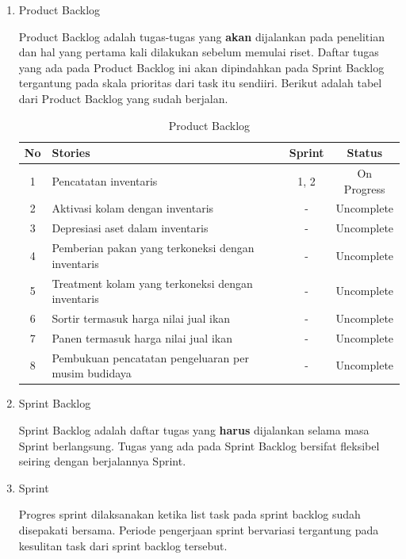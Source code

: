\begin{enumerate}
	\item Product Backlog
	
	Product Backlog adalah tugas-tugas yang \textbf{akan} dijalankan pada penelitian dan hal yang pertama kali dilakukan sebelum memulai riset. Daftar tugas yang ada pada Product Backlog ini akan dipindahkan pada Sprint Backlog tergantung pada skala prioritas dari task itu sendiiri. Berikut adalah tabel dari Product Backlog yang sudah berjalan.

	\begin{table}[H]	
		\begin{center}
			\caption{Product Backlog}
			\label{tab:table5}
			\begin{tabular}{|c|m{17em}|c|c|}
			\hline
			\textbf{No} & \textbf{Stories} & \textbf{Sprint} & \textbf{Status} \\
			\hline
			1 & Pencatatan inventaris & 1, 2 & On Progress \\
			\hline
			2 & Aktivasi kolam dengan inventaris & - & Uncomplete \\
			\hline
			3 & Depresiasi aset dalam inventaris & - & Uncomplete \\
			\hline
			4 & Pemberian pakan yang terkoneksi dengan inventaris & - & Uncomplete \\
			\hline
			5 & Treatment kolam yang terkoneksi dengan inventaris & - & Uncomplete \\
			\hline
			6 & Sortir termasuk harga nilai jual ikan & - & Uncomplete \\
			\hline
			7 & Panen termasuk harga nilai jual ikan & - & Uncomplete \\
			\hline
			8 & Pembukuan pencatatan pengeluaran per musim budidaya & - & Uncomplete \\
			\hline
			\end{tabular}
		\end{center}
	\end{table}	

	\item Sprint Backlog
	
	Sprint Backlog adalah daftar tugas yang \textbf{harus} dijalankan selama masa Sprint berlangsung. Tugas yang ada pada Sprint Backlog bersifat fleksibel seiring dengan berjalannya Sprint.

	\item Sprint
	
	Progres sprint dilaksanakan ketika list task pada sprint backlog sudah disepakati bersama. Periode pengerjaan sprint bervariasi tergantung pada kesulitan task dari sprint backlog tersebut.


\end{enumerate}
